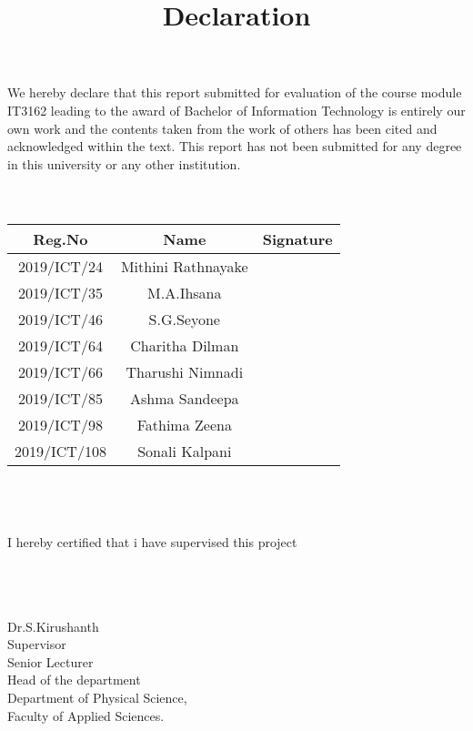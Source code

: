 \documentclass{article}
\begin{document}
\title{\textbf{Declaration}}
\maketitle

We hereby declare that this report submitted for evaluation of the course module IT3162 leading to the award of Bachelor of Information Technology is entirely our own work and the contents taken from the work of others has been cited and acknowledged within the text. This report has not been submitted for any degree in this university or any other institution.
\\\\\\
\begin{tabular}{|c|c|c|}
\hline
Reg.No & Name & Signature \\
\hline
2019/ICT/24 & Mithini Rathnayake & \\
\hline
2019/ICT/35 & M.A.Ihsana & \\
\hline
2019/ICT/46 & S.G.Seyone & \\
\hline
2019/ICT/64 & Charitha Dilman & \\
\hline
2019/ICT/66 & Tharushi Nimnadi & \\
\hline
2019/ICT/85 & Ashma Sandeepa & \\
\hline
2019/ICT/98 & Fathima Zeena & \\
\hline
2019/ICT/108 & Sonali Kalpani & \\
\hline
\end{tabular}
\\\\\\
I hereby certified that i have supervised this project
\\\\\\
\newcommand*{\Signature}[1]{%
    \par\noindent\makebox[2.0in]{\hrulefill} \hfill\makebox[1.5in]{\hrulefill}%
}%

\Signature \\ \\{Dr.S.Kirushanth} \hspace{2.9in}{Date}\\ {Supervisor}\\{Senior Lecturer}\\{Head of the department}\\{Department of Physical Science,}\\{Faculty of Applied Sciences.}
\end{document}
